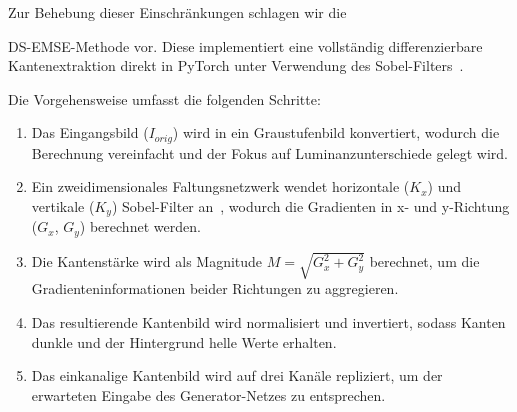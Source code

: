 Zur Behebung dieser Einschränkungen schlagen wir die {\ac{DS-EMSE}-Methode vor. Diese implementiert eine vollständig differenzierbare Kantenextraktion direkt in PyTorch unter Verwendung des Sobel-Filters~\cite{Sobel2014operator}.

\newpage

Die Vorgehensweise umfasst die folgenden Schritte:
\begin{enumerate}
    \item Das Eingangsbild ($I_{orig}$) wird in ein Graustufenbild konvertiert, wodurch die Berechnung vereinfacht und der Fokus auf Luminanzunterschiede gelegt wird.
    \item Ein zweidimensionales Faltungsnetzwerk wendet horizontale ($K_x$) und vertikale ($K_y$) Sobel-Filter an~\cite{Sobel2014operator}, wodurch die Gradienten in x- und y-Richtung ($G_x$, $G_y$) berechnet werden.
    \item Die Kantenstärke wird als Magnitude $M = \sqrt{G_x^2 + G_y^2}$ berechnet, um die Gradienteninformationen beider Richtungen zu aggregieren.
    \item Das resultierende Kantenbild wird normalisiert und invertiert, sodass Kanten dunkle und der Hintergrund helle Werte erhalten.
    \item Das einkanalige Kantenbild wird auf drei Kanäle repliziert, um der erwarteten Eingabe des Generator-Netzes zu entsprechen.
\end{enumerate}







}
